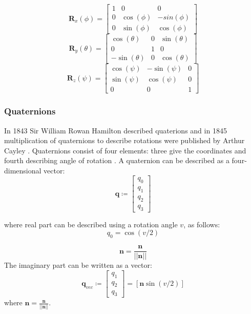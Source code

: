 \documentclass[12pt,a4paper,oneside]{article}
\begin{document}
\begin{equation} \label{eq:euler_rx}
\bm{R}_x(\phi) = \begin{bmatrix}
1 & 0 & 0 \\
0 & \cos(\phi) & -sin(\phi) \\
0 & \sin(\phi) & \cos(\phi)
\end{bmatrix}
\end{equation}
\begin{equation} \label{eq:euler_ry}
\bm{R}_y(\theta) = \begin{bmatrix}
\cos(\theta) & 0 & \sin(\theta) \\
0 & 1 & 0 \\
-\sin(\theta) & 0 & \cos(\theta)
\end{bmatrix}
\end{equation}
\begin{equation} \label{eq:euler_rz}
\bm{R}_z(\psi) = \begin{bmatrix}
\cos(\psi) & -\sin(\psi) & 0 \\
\sin(\psi) & \cos(\psi) & 0 \\
0 & 0 & 1
\end{bmatrix}
\end{equation}

\subsubsection{Quaternions}

In 1843 Sir William Rowan Hamilton described quaterions \citet{hamilton1844lxxviii} and in 1845 multiplication of quaternions to describe rotations were published by Arthur Cayley \citet{cayley1845xiii}. Quaternions consist of four elements: three give the coordinates and fourth describing angle of rotation \citet{courant1953methods}.
A quaternion can be described as a four-dimensional vector:
\begin{equation}
\bm{q} \coloneqq \begin{bmatrix}
q_0 \\
q_1 \\
q_2 \\
q_3
\end{bmatrix}
\end{equation}

where real part can be described using a rotation angle $v$, as follows:
\begin{equation}
q_0 = \cos(v/2)
\end{equation}

\begin{equation}
\bm{n} = \frac{\bm{n}}{||\bm{n}||}
\end{equation}
The imaginary part can be written as a vector:
\begin{equation}
\bm{q}_{vec} \coloneqq \begin{bmatrix}
q_1 \\
q_2 \\
q_3
\end{bmatrix}
= [\bm{n}\sin(v/2)]
\end{equation}
where $\bm{n} = \frac{\bm{n}}{||\bm{n}||}$.
\end{document}

